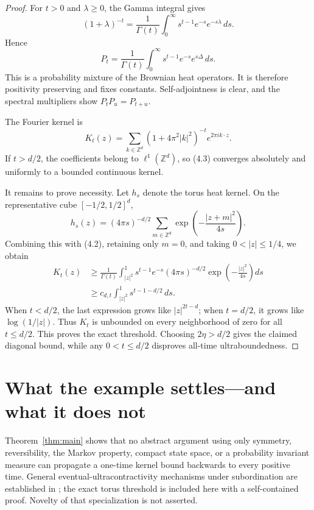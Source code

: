 \documentclass[11pt]{article}
\theoremstyle{remark}
\newcommand{\Z}{\mathbb Z}
\begin{document}
\begin{proof}
For $t>0$ and $\lambda\geq0$, the Gamma integral gives
\[
 (1+\lambda)^{-t}=\frac1{\Gamma(t)}\int_0^\infty
 s^{t-1}e^{-s}e^{-s\lambda}\,ds.                         \tag{4.1}
\]
Hence
\[
 P_t=\frac1{\Gamma(t)}\int_0^\infty s^{t-1}e^{-s}e^{s\Delta}\,ds.
                                                                    \tag{4.2}
\]
This is a probability mixture of the Brownian heat operators.  It is
therefore positivity preserving and fixes constants.  Self-adjointness is
clear, and the spectral multipliers show $P_tP_u=P_{t+u}$.

The Fourier kernel is
\[
 K_t(z)=\sum_{k\in\Z^d}(1+4\pi^2|k|^2)^{-t}e^{2\pi i k\cdot z}.
                                                                    \tag{4.3}
\]
If $t>d/2$, the coefficients belong to $\ell^1(\Z^d)$, so (4.3)
converges absolutely and uniformly to a bounded continuous kernel.

It remains to prove necessity.  Let $h_s$ denote the torus heat kernel.  On
the representative cube $[-1/2,1/2]^d$,
\[
 h_s(z)=(4\pi s)^{-d/2}\sum_{m\in\Z^d}
          \exp\!\left(-\frac{|z+m|^2}{4s}\right).
\]
Combining this with (4.2), retaining only $m=0$, and taking
$0<|z|\leq1/4$, we obtain
\begin{align*}
 K_t(z)
 &\geq \frac1{\Gamma(t)}\int_{|z|^2}^{1}
 s^{t-1}e^{-s}(4\pi s)^{-d/2}
 \exp\!\left(-\frac{|z|^2}{4s}\right)ds\\
 &\geq c_{d,t}\int_{|z|^2}^{1}s^{t-1-d/2}\,ds.             \tag{4.4}
\end{align*}
When $t<d/2$, the last expression grows like
$|z|^{2t-d}$; when $t=d/2$, it grows like $\log(1/|z|)$.
Thus $K_t$ is unbounded on every neighborhood of zero for all $t\leq d/2$.
This proves the exact threshold.  Choosing $2\eta>d/2$ gives the claimed
diagonal bound, while any $0<t\leq d/2$ disproves all-time
ultraboundedness.
\end{proof}

\section{What the example settles---and what it does not}

Theorem~\ref{thm:main} shows that no abstract argument using only symmetry,
reversibility, the Markov property, compact state space, or a probability
invariant measure can propagate a one-time kernel bound backwards to every
positive time.  General eventual-ultracontractivity mechanisms under
subordination are established in \cite{BCS,GM}; the exact torus threshold is
included here with a self-contained proof.  Novelty of that specialization
is not asserted.
\end{document}
